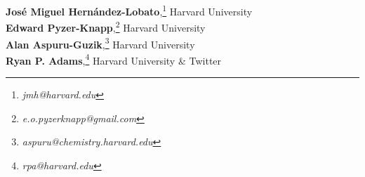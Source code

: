 \textbf{Jos\'e Miguel Hern\'andez-Lobato},\footnote{\textit{jmh@harvard.edu}} {Harvard University}\\
\textbf{Edward Pyzer-Knapp},\footnote{\textit{e.o.pyzerknapp@gmail.com}} {Harvard University}\\
\textbf{Alan Aspuru-Guzik},\footnote{\textit{aspuru@chemistry.harvard.edu }} {Harvard University}\\
\textbf{Ryan P. Adams},\footnote{\textit{rpa@harvard.edu}} {Harvard University} \& {Twitter}